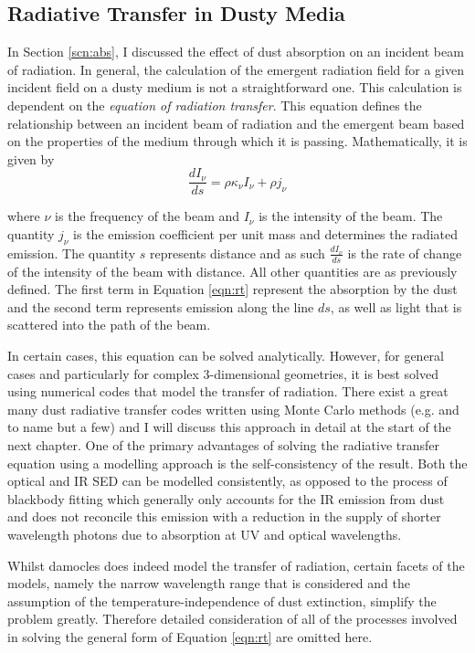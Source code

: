 \subsection{Radiative Transfer in Dusty Media}
\label{scn:rt}
In Section \ref{scn:abs}, I discussed the effect of dust absorption on an incident beam of radiation.  In general, the calculation of the emergent radiation field for a given incident field on a dusty medium is not a straightforward one.  This calculation is dependent on the {\em equation of radiation transfer}.  This equation defines the relationship between an incident beam of radiation and the emergent beam based on the properties of the medium through which it is passing.  Mathematically, it is given by 
\begin{equation}
\label{eqn:rt}
\frac{dI_{\nu}}{ds}=\rho \kappa_{\nu} I_{\nu} + \rho j_{\nu}
\end{equation}
 
\noindent where $\nu$ is the frequency of the beam and $I_{\nu}$ is the intensity of the beam.  The quantity $j_{\nu}$ is the emission coefficient per unit mass and determines the radiated emission.  The quantity $s$ represents distance and as such $\frac{dI_{\nu}}{ds}$ is the rate of change of the intensity of the beam with distance.  All other quantities are as previously defined.  The first term in Equation \ref{eqn:rt} represent the absorption by the dust and the second term represents emission along the line $ds$, as well as light that is scattered into the path of the beam.

In certain cases, this equation can be solved analytically.  However, for general cases and particularly for complex 3-dimensional geometries, it is best solved using numerical codes that model the transfer of radiation.  There exist a great many dust radiative transfer codes written using Monte Carlo methods (e.g. \citealt{Harries2000,Wood2001,Baes2003,Wood2004,Ercolano2005} and \citealt{Robitaille2011} to name but a few) and I will discuss this approach in detail at the start of the next chapter.  One of the primary advantages of solving the radiative transfer equation using a modelling approach is the self-consistency of the result.  Both the optical and IR SED can be modelled consistently, as opposed to the process of blackbody fitting which generally only accounts for the IR emission from dust and does not reconcile this emission with a reduction in the supply of shorter wavelength photons due to absorption at UV and optical wavelengths.

Whilst {\sc damocles} does indeed model the transfer of radiation, certain facets of the models, namely the narrow wavelength range that is considered and the assumption of the temperature-independence of dust extinction, simplify the problem greatly. Therefore detailed consideration of all of the processes involved in solving the general form of Equation \ref{eqn:rt} are omitted here.

